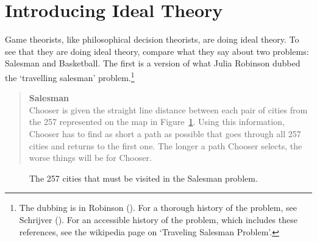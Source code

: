 \documentclass[
  12pt,
  letterpaper,
  DIV=11,
  numbers=noendperiod]{scrreprt}
\begin{document}
\section{Introducing Ideal Theory}\label{sec-ideal-intro}

Game theorists, like philosophical decision theorists, are doing ideal
theory. To see that they are doing ideal theory, compare what they say
about two problems: Salesman and Basketball. The first is a version of
what Julia Robinson dubbed the `travelling salesman' problem.\footnote{The
  dubbing is in Robinson (). For a
  thorough history of the problem, see Schrijver
  (). For an accessible history of the
  problem, which includes these references, see the wikipedia page on
  `Traveling Salesman Problem'.}

\begin{quote}
\textbf{Salesman}\\
Chooser is given the straight line distance between each pair of cities
from the 257 represented on the map in Figure~\ref{fig-salesman-points}.
Using this information, Chooser has to find as short a path as possible
that goes through all 257 cities and returns to the first one. The
longer a path Chooser selects, the worse things will be for Chooser.
\end{quote}

\begin{figure}


\caption{\label{fig-salesman-points}The 257 cities that must be visited
in the Salesman problem.}

\end{figure}%
\end{document}
